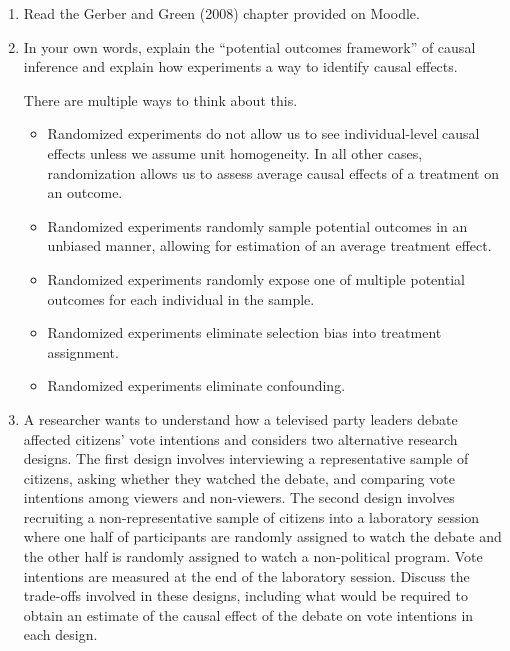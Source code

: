 \documentclass[a4paper]{exam}
\begin{document}
\begin{enumerate}
\item Read the Gerber and Green (2008) chapter provided on Moodle.

\item  In your own words, explain the ``potential outcomes framework'' of causal inference and explain how experiments a way to identify causal effects.

\begin{solution}

There are multiple ways to think about this.

\begin{itemize}
\item Randomized experiments do not allow us to see individual-level causal effects unless we assume unit homogeneity. In all other cases, randomization allows us to assess average causal effects of a treatment on an outcome.
\item Randomized experiments randomly sample potential outcomes in an unbiased manner, allowing for estimation of an average treatment effect.
\item Randomized experiments randomly expose one of multiple potential outcomes for each individual in the sample.
\item Randomized experiments eliminate selection bias into treatment assignment.
\item Randomized experiments eliminate confounding.
\end{itemize}

\end{solution}

\item A researcher wants to understand how a televised party leaders debate affected citizens' vote intentions and considers two alternative research designs. The first design involves interviewing a representative sample of citizens, asking whether they watched the debate, and comparing vote intentions among viewers and non-viewers. The second design involves recruiting a non-representative sample of citizens into a laboratory session where one half of participants are randomly assigned to watch the debate and the other half is randomly assigned to watch a non-political program. Vote intentions are measured at the end of the laboratory session. Discuss the trade-offs involved in these designs, including what would be required to obtain an estimate of the causal effect of the debate on vote intentions in each design.

\begin{solution}


\end{solution}
\end{enumerate}
\end{document}

